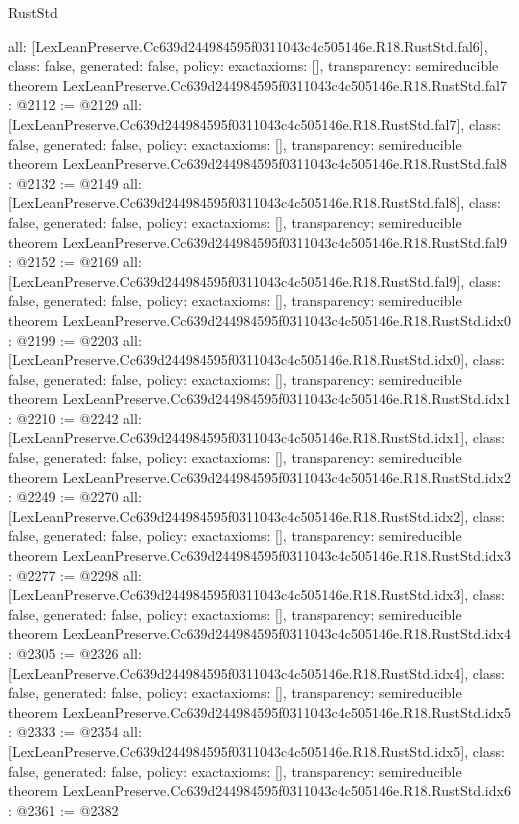 \begin{lexlean}{RustStd}
\begin{coremodule}
{  all: [LexLeanPreserve.Cc639d244984595f0311043c4c505146e.R18.RustStd.fal6],
  class: false,
  generated: false,
  policy: exact{axioms: []},
  transparency: semireducible
}
theorem LexLeanPreserve.Cc639d244984595f0311043c4c505146e.R18.RustStd.fal7 : @2112 := @2129 {
  all: [LexLeanPreserve.Cc639d244984595f0311043c4c505146e.R18.RustStd.fal7],
  class: false,
  generated: false,
  policy: exact{axioms: []},
  transparency: semireducible
}
theorem LexLeanPreserve.Cc639d244984595f0311043c4c505146e.R18.RustStd.fal8 : @2132 := @2149 {
  all: [LexLeanPreserve.Cc639d244984595f0311043c4c505146e.R18.RustStd.fal8],
  class: false,
  generated: false,
  policy: exact{axioms: []},
  transparency: semireducible
}
theorem LexLeanPreserve.Cc639d244984595f0311043c4c505146e.R18.RustStd.fal9 : @2152 := @2169 {
  all: [LexLeanPreserve.Cc639d244984595f0311043c4c505146e.R18.RustStd.fal9],
  class: false,
  generated: false,
  policy: exact{axioms: []},
  transparency: semireducible
}
theorem LexLeanPreserve.Cc639d244984595f0311043c4c505146e.R18.RustStd.idx0 : @2199 := @2203 {
  all: [LexLeanPreserve.Cc639d244984595f0311043c4c505146e.R18.RustStd.idx0],
  class: false,
  generated: false,
  policy: exact{axioms: []},
  transparency: semireducible
}
theorem LexLeanPreserve.Cc639d244984595f0311043c4c505146e.R18.RustStd.idx1 : @2210 := @2242 {
  all: [LexLeanPreserve.Cc639d244984595f0311043c4c505146e.R18.RustStd.idx1],
  class: false,
  generated: false,
  policy: exact{axioms: []},
  transparency: semireducible
}
theorem LexLeanPreserve.Cc639d244984595f0311043c4c505146e.R18.RustStd.idx2 : @2249 := @2270 {
  all: [LexLeanPreserve.Cc639d244984595f0311043c4c505146e.R18.RustStd.idx2],
  class: false,
  generated: false,
  policy: exact{axioms: []},
  transparency: semireducible
}
theorem LexLeanPreserve.Cc639d244984595f0311043c4c505146e.R18.RustStd.idx3 : @2277 := @2298 {
  all: [LexLeanPreserve.Cc639d244984595f0311043c4c505146e.R18.RustStd.idx3],
  class: false,
  generated: false,
  policy: exact{axioms: []},
  transparency: semireducible
}
theorem LexLeanPreserve.Cc639d244984595f0311043c4c505146e.R18.RustStd.idx4 : @2305 := @2326 {
  all: [LexLeanPreserve.Cc639d244984595f0311043c4c505146e.R18.RustStd.idx4],
  class: false,
  generated: false,
  policy: exact{axioms: []},
  transparency: semireducible
}
theorem LexLeanPreserve.Cc639d244984595f0311043c4c505146e.R18.RustStd.idx5 : @2333 := @2354 {
  all: [LexLeanPreserve.Cc639d244984595f0311043c4c505146e.R18.RustStd.idx5],
  class: false,
  generated: false,
  policy: exact{axioms: []},
  transparency: semireducible
}
theorem LexLeanPreserve.Cc639d244984595f0311043c4c505146e.R18.RustStd.idx6 : @2361 := @2382 {
}
\end{coremodule}
\end{lexlean}
